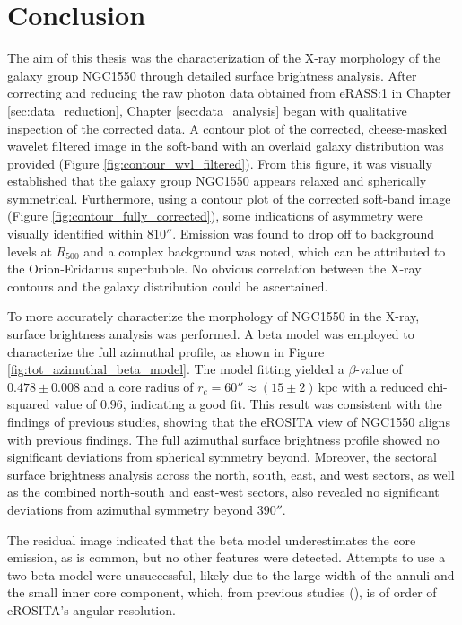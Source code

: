 
\chapter{Conclusion}
\label{sec:conclusion}
The aim of this thesis was the characterization of the X-ray morphology of the galaxy group NGC1550 through detailed surface brightness analysis. After correcting and reducing the raw photon data obtained from eRASS:1 in Chapter \ref{sec:data_reduction}, Chapter \ref{sec:data_analysis} began with qualitative inspection of the corrected data. A contour plot of the corrected, cheese-masked wavelet filtered image in the soft-band with an overlaid galaxy distribution was provided (Figure \ref{fig:contour_wvl_filtered}). From this figure, it was visually established that the galaxy group NGC1550 appears relaxed and spherically symmetrical. Furthermore, using a contour plot of the corrected soft-band image (Figure \ref{fig:contour_fully_corrected}), some indications of asymmetry were visually identified within \(810''\). Emission was found to drop off to background levels at \(R_{500}\) and a complex background was noted, which can be attributed to the Orion-Eridanus superbubble. No obvious correlation between the X-ray contours and the galaxy distribution could be ascertained.

To more accurately characterize the morphology of NGC1550 in the X-ray, surface brightness analysis was performed. A beta model was employed to characterize the full azimuthal profile, as shown in Figure \ref{fig:tot_azimuthal_beta_model}. The model fitting yielded a \(\beta\)-value of \(0.478 \pm 0.008\) and a core radius of \(r_c = 60'' \approx (15\pm2)\,\text{kpc}\) with a reduced chi-squared value of \(0.96\), indicating a good fit. This result was consistent with the findings of previous studies, showing that the eROSITA view of NGC1550 aligns with previous findings. The full azimuthal surface brightness profile showed no significant deviations from spherical symmetry beyond. Moreover, the sectoral surface brightness analysis across the north, south, east, and west sectors, as well as the combined north-south and east-west sectors, also revealed no significant deviations from azimuthal symmetry beyond \(390''\).

The residual image indicated that the beta model underestimates the core emission, as is common, but no other features were detected. Attempts to use a two beta model were unsuccessful, likely due to the large width of the annuli and the small inner core component, which, from previous studies (\cite{Kawaharada_2009}), is of order of eROSITA's angular resolution. 

